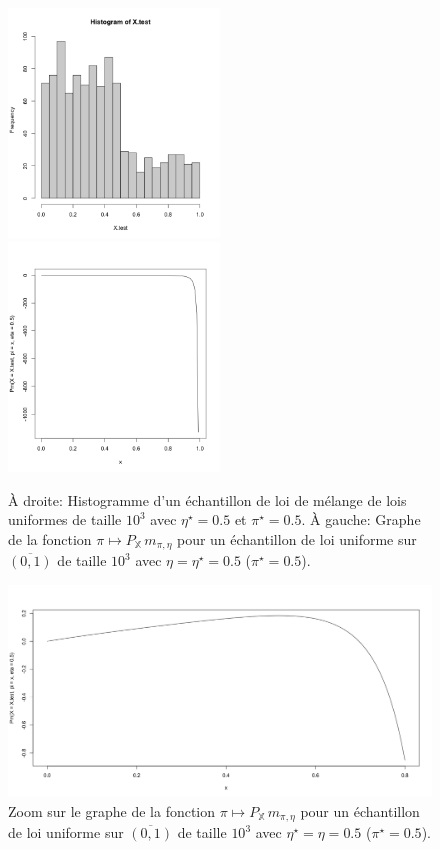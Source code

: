 \documentclass{article}
\begin{document}
    \begin{figure}[H]
        \includegraphics[width=0.5\textwidth]{img/hist_1.png}
        \hspace{\fill}
        \includegraphics[width=0.5\textwidth]{img/Pm_2.png}
        \caption{À droite: Histogramme d'un échantillon de loi de mélange de lois uniformes de taille $10^3$ avec $\eta^\star=0.5$ et $\pi^\star=0.5$. À gauche: Graphe de la fonction $\pi\mapsto{}P_\mathbb{X}\,m_{\pi,\eta}$ pour un échantillon de loi uniforme sur $\overline{(0,1)}$ de taille $10^3$ avec $\eta=\eta^\star=0.5$ ($\pi^\star=0.5$).}
    \end{figure}

    \begin{figure}[H]
        \centering
        \includegraphics[width=\textwidth]{img/zoom_1.png}
        \caption{Zoom sur le graphe de la fonction $\pi\mapsto{}P_\mathbb{X}\,m_{\pi,\eta}$ pour un échantillon de loi uniforme sur $\overline{(0,1)}$ de taille $10^3$ avec $\eta^\star=\eta=0.5$ ($\pi^\star=0.5$).}
    \end{figure}
\end{document}
